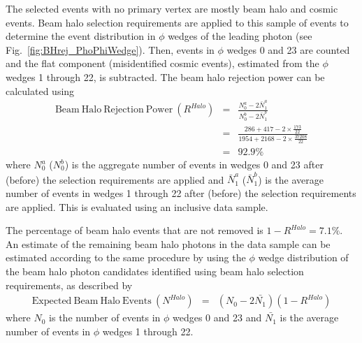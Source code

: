 The selected events with no primary vertex are mostly beam halo and cosmic events. Beam halo selection requirements are applied to this sample of events to determine the event distribution in $\phi$ wedges of the leading photon (see Fig.~\ref{fig:BHrej_PhoPhiWedge}). Then, events in $\phi$ wedges 0 and 23 are counted and the flat component (misidentified cosmic events), estimated from the $\phi$ wedges 1 through 22, is subtracted. The beam halo rejection power can be calculated using
\begin{eqnarray}
 \mathrm{Beam~Halo~Rejection~Power}~(R^{Halo})&=& \frac{N_{0}^{a} - {2\bar{N}_{1}^{a} }}{N_{0}^{b} - {2\bar{N}_{1}^{b} }}\\
 &=& \frac{{286 + 417- 2\times \frac{173}{22}}}{1954 + 2168 - 2 \times \frac{37208}{22}} \nonumber\\
 &=& 92.9\%
\label{eqa:HaloRejectionPower}
\end{eqnarray}
where $N_{0}^{a}$ ($N_{0}^{b}$) is the aggregate number of events in wedges 0 and 23 after (before) the selection requirements are applied and $\bar{N}_{1}^{a}$ ($\bar{N}_{1}^{b}$) is the average number of events in wedges 1 through 22 after (before) the selection requirements are applied. This is evaluated using an inclusive \phoonejet data sample.

The percentage of beam halo events that are not removed is $1-R^{Halo} = 7.1\%$. An estimate of the remaining beam halo photons in the data sample can be estimated according to the same procedure by using the $\phi$ wedge distribution of the beam halo photon candidates identified using beam halo selection requirements, as described by
\begin{eqnarray}
 \mathrm{Expected~Beam~Halo~Events}~(N^{Halo})&=& (N_{0} - 2\bar{N_{1}}) (1-R^{Halo})
\label{eqa:HaloEstimate}
\end{eqnarray}
where $N_{0}$ is the number of events in $\phi$ wedges 0 and 23 and $\bar{N_{1}}$ is the average number of events in $\phi$ wedges 1 through 22.

